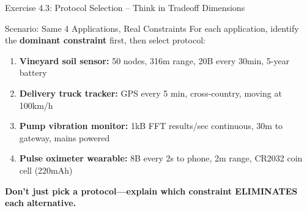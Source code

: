 \documentclass[aspectratio=169,11pt]{beamer}
\begin{document}
\begin{frame}{Exercise 4.3: Protocol Selection -- Think in Tradeoff Dimensions}
    \begin{block}{Scenario: Same 4 Applications, Real Constraints}
        For each application, identify the \textbf{dominant constraint} first, then select protocol:
        \begin{enumerate}
            \item \textbf{Vineyard soil sensor:} 50 nodes, 316m range, 20B every 30min, 5-year battery
            \item \textbf{Delivery truck tracker:} GPS every 5 min, cross-country, moving at 100km/h
            \item \textbf{Pump vibration monitor:} 1kB FFT results/sec continuous, 30m to gateway, mains powered
            \item \textbf{Pulse oximeter wearable:} 8B every 2s to phone, 2m range, CR2032 coin cell (220mAh)
        \end{enumerate}
    \end{block}
    
    \textbf{Don't just pick a protocol---explain which constraint ELIMINATES each alternative.}
\end{frame}
\end{document}
